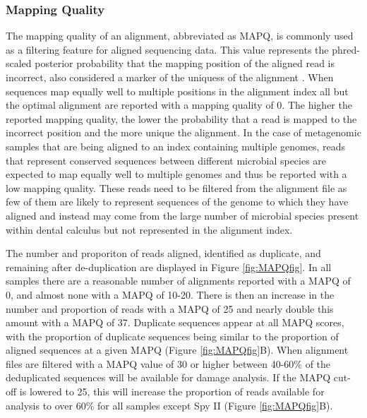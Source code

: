 \documentclass[12pt, a4paper]{article}
\begin{document}
\subsubsection{Mapping Quality}\label{sssec:MAPQ}

The mapping quality of an alignment, abbreviated as MAPQ, is commonly used as a filtering feature for aligned sequencing data. This value represents the phred-scaled posterior probability that the mapping position of the aligned read is incorrect, also considered a marker of the uniquess of the alignment \cite{Li:2009aa}. When sequences map equally well to multiple positions in the alignment index all but the optimal alignment are reported with a mapping quality of 0. The higher the reported mapping quality, the lower the probability that a read is mapped to the incorrect position and the more unique the alignment. In the case of metagenomic samples that are being aligned to an index containing multiple genomes, reads that represent conserved sequences between different microbial species are expected to map equally well to multiple genomes and thus be reported with a low mapping quality. These reads need to be filtered from the alignment file as few of them are likely to represent sequences of the genome to which they have aligned and instead may come from the large number of microbial species present within dental calculus but not represented in the alignment index.

The number and proporiton of reads aligned, identified as duplicate, and remaining after de-duplication are displayed in Figure \ref{fig:MAPQfig}. In all samples there are a reasonable number of alignments reported with a MAPQ of 0, and almost none with a MAPQ of 10-20. There is then an increase in the number and proportion of reads with a MAPQ of 25 and nearly double this amount with a MAPQ of 37. Duplicate sequences appear at all MAPQ scores, with the proportion of duplicate sequences being similar to the proportion of aligned sequences at a given MAPQ (Figure \ref{fig:MAPQfig}B). When alignment files are filtered with a MAPQ value of 30 or higher between 40-60\% of the deduplicated sequences will be available for damage analysis. If the MAPQ cut-off is lowered to 25, this will increase the proportion of reads available for analysis to over 60\% for all samples except Spy II (Figure \ref{fig:MAPQfig}B).
\end{document}
